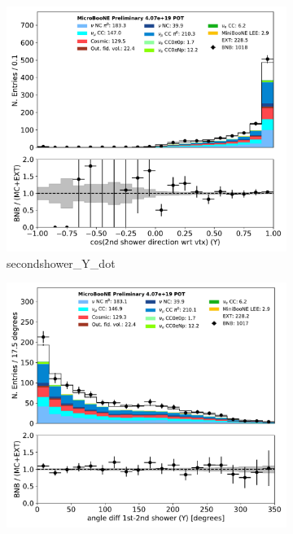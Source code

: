 \documentclass[a4paper]{article}
\begin{document}
\begin{figure}[H] 
\begin{center}
    \begin{subfigure}[b]{0.3\textwidth}
    \centering
    \includegraphics[width=1.00\textwidth]{1eNp/dataMCRun1/secondshower_Y_dot01152020.pdf}
    \caption{\label{fig:1eNp:dataMCRun1:secondshower_Y_dot} secondshower\_Y\_dot }
    \end{subfigure}
    \begin{subfigure}[b]{0.3\textwidth}
    \centering
    \includegraphics[width=1.00\textwidth]{1eNp/dataMCRun1/anglediff_Y01152020.pdf}

\end{subfigure}
\end{center}
\end{figure}
\end{document}
